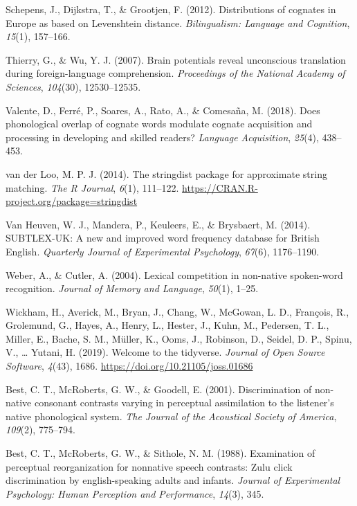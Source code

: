 \documentclass[
]{article}
\newlength{\cslhangindent}
\newenvironment{CSLReferences}[2] %
 {\begin{list}{}{%
  \setlength{\itemindent}{0pt}
  \setlength{\leftmargin}{0pt}
  \setlength{\parsep}{0pt}
  \ifodd #1
   \setlength{\leftmargin}{\cslhangindent}
   \setlength{\itemindent}{-1\cslhangindent}
  \fi
  \setlength{\itemsep}{#2\baselineskip}}}
 {\end{list}}
\begin{document}
\begin{CSLReferences}{1}{0}
Schepens, J., Dijkstra, T., \& Grootjen, F. (2012). Distributions of
cognates in {Europe} as based on {Levenshtein} distance.
\emph{Bilingualism: Language and Cognition}, \emph{15}(1), 157--166.

Thierry, G., \& Wu, Y. J. (2007). Brain potentials reveal unconscious
translation during foreign-language comprehension. \emph{Proceedings of
the National Academy of Sciences}, \emph{104}(30), 12530--12535.

Valente, D., Ferré, P., Soares, A., Rato, A., \& Comesaña, M. (2018).
Does phonological overlap of cognate words modulate cognate acquisition
and processing in developing and skilled readers? \emph{Language
Acquisition}, \emph{25}(4), 438--453.

van der Loo, M. P. J. (2014). The stringdist package for approximate
string matching. \emph{The R Journal}, \emph{6}(1), 111--122.
\url{https://CRAN.R-project.org/package=stringdist}

Van Heuven, W. J., Mandera, P., Keuleers, E., \& Brysbaert, M. (2014).
{SUBTLEX-UK}: {A} new and improved word frequency database for {British
English}. \emph{Quarterly Journal of Experimental Psychology},
\emph{67}(6), 1176--1190.

Weber, A., \& Cutler, A. (2004). Lexical competition in non-native
spoken-word recognition. \emph{Journal of Memory and Language},
\emph{50}(1), 1--25.

Wickham, H., Averick, M., Bryan, J., Chang, W., McGowan, L. D.,
François, R., Grolemund, G., Hayes, A., Henry, L., Hester, J., Kuhn, M.,
Pedersen, T. L., Miller, E., Bache, S. M., Müller, K., Ooms, J.,
Robinson, D., Seidel, D. P., Spinu, V., \ldots{} Yutani, H. (2019).
Welcome to the tidyverse. \emph{Journal of Open Source Software},
\emph{4}(43), 1686. \url{https://doi.org/10.21105/joss.01686}

Best, C. T., McRoberts, G. W., \& Goodell, E. (2001). Discrimination of
non-native consonant contrasts varying in perceptual assimilation to the
listener's native phonological system. \emph{The Journal of the
Acoustical Society of America}, \emph{109}(2), 775--794.

Best, C. T., McRoberts, G. W., \& Sithole, N. M. (1988). Examination of
perceptual reorganization for nonnative speech contrasts: Zulu click
discrimination by english-speaking adults and infants. \emph{Journal of
Experimental Psychology: Human Perception and Performance},
\emph{14}(3), 345.


\end{CSLReferences}
\end{document}
